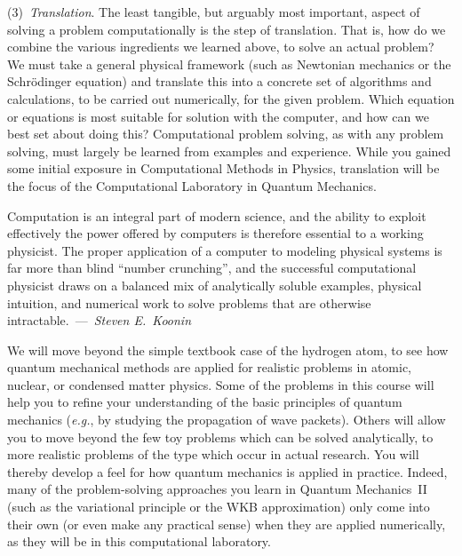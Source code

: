 \documentclass[12pt]{mcplain}
\begin{document}
(3)~\textit{Translation}. The least tangible, but arguably most important,
aspect of solving a problem computationally is the step of translation. That is,
how do we combine the various ingredients we learned above, to solve an actual
problem? We must take a general physical framework (such as Newtonian mechanics
or the Schr\"odinger equation) and translate this into a concrete set of
algorithms and calculations, to be carried out numerically, for the given
problem. Which equation or equations is most suitable for solution with the
computer, and how can we best set about doing this? Computational problem
solving, as with any problem solving, must largely be learned from examples and
experience.  While you gained some initial exposure in Computational Methods in
Physics, translation will be the focus of the Computational Laboratory in
Quantum Mechanics.


\begin{leftindent}[0.5in]
 \footnotesize
 Computation is an integral part of modern science, and the ability to exploit
 effectively the power offered by computers is therefore essential to a working
 physicist.  The proper application of a computer to modeling physical systems
 is far more than blind ``number crunching'', and the successful computational
 physicist draws on a balanced mix of analytically soluble examples, physical
 intuition, and numerical work to solve problems that are otherwise
 intractable.~---~\textit{Steven E.~Koonin}
\end{leftindent}

We will move beyond the simple textbook case of the hydrogen atom, to see how
quantum mechanical methods are applied for realistic problems in atomic,
nuclear, or condensed matter physics. Some of the problems in this course will
help you to refine your understanding of the basic principles of quantum
mechanics (\textit{e.g.}, by studying the propagation of wave packets).  Others
will allow you to move beyond the few toy problems which can be solved
analytically, to more realistic problems of the type which occur in actual
research.  You will thereby develop a feel for how quantum mechanics is applied
in practice.  Indeed, many of the problem-solving approaches you learn in
Quantum Mechanics~II (such as the variational principle or the WKB
approximation) only come into their own (or even make any practical sense) when
they are applied numerically, as they will be in this computational laboratory.
\end{document}
